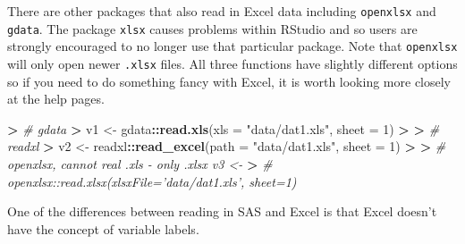 \documentclass[
]{book}
\newenvironment{Shaded}{\begin{snugshade}}{\end{snugshade}}
\newcommand{\CommentTok}[1]{\textcolor[rgb]{0.56,0.35,0.01}{\textit{#1}}}
\newcommand{\DataTypeTok}[1]{\textcolor[rgb]{0.13,0.29,0.53}{#1}}
\newcommand{\DecValTok}[1]{\textcolor[rgb]{0.00,0.00,0.81}{#1}}
\newcommand{\ErrorTok}[1]{\textcolor[rgb]{0.64,0.00,0.00}{\textbf{#1}}}
\newcommand{\KeywordTok}[1]{\textcolor[rgb]{0.13,0.29,0.53}{\textbf{#1}}}
\newcommand{\NormalTok}[1]{#1}
\newcommand{\OperatorTok}[1]{\textcolor[rgb]{0.81,0.36,0.00}{\textbf{#1}}}
\newcommand{\StringTok}[1]{\textcolor[rgb]{0.31,0.60,0.02}{#1}}
\begin{document}
There are other packages that also read in Excel data including \texttt{openxlsx} and \texttt{gdata}. The package \texttt{xlsx} causes problems within RStudio and so users are strongly encouraged to no longer use that particular package. Note that \texttt{openxlsx} will only open newer \texttt{.xlsx} files. All three functions have slightly different options so if you need to do something fancy with Excel, it is worth looking more closely at the help pages.

\begin{Shaded}
\begin{Highlighting}[]
\OperatorTok{>}\StringTok{ }\CommentTok{# gdata}
\ErrorTok{>}\StringTok{ }\NormalTok{v1 <-}\StringTok{ }\NormalTok{gdata}\OperatorTok{::}\KeywordTok{read.xls}\NormalTok{(}\DataTypeTok{xls =} \StringTok{"data/dat1.xls"}\NormalTok{, }\DataTypeTok{sheet =} \DecValTok{1}\NormalTok{)}
\OperatorTok{>}\StringTok{ }
\ErrorTok{>}\StringTok{ }\CommentTok{# readxl}
\ErrorTok{>}\StringTok{ }\NormalTok{v2 <-}\StringTok{ }\NormalTok{readxl}\OperatorTok{::}\KeywordTok{read_excel}\NormalTok{(}\DataTypeTok{path =} \StringTok{"data/dat1.xls"}\NormalTok{, }\DataTypeTok{sheet =} \DecValTok{1}\NormalTok{)}
\OperatorTok{>}\StringTok{ }
\ErrorTok{>}\StringTok{ }\CommentTok{# openxlsx, cannot real .xls - only .xlsx v3 <-}
\ErrorTok{>}\StringTok{ }\CommentTok{# openxlsx::read.xlsx(xlsxFile='data/dat1.xls', sheet=1)}
\end{Highlighting}
\end{Shaded}

One of the differences between reading in SAS and Excel is that Excel doesn't have the concept of variable labels.
\end{document}
